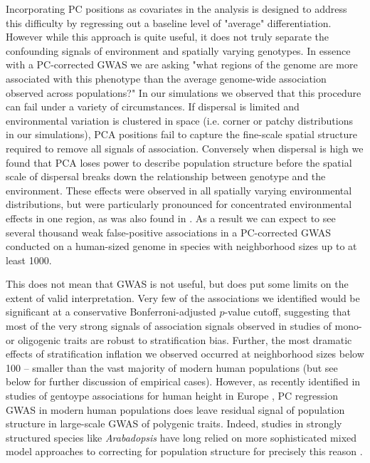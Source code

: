 \documentclass[11pt,twoside,lineno]{preprint}
\begin{document}
Incorporating PC positions as covariates in the analysis \citep{Price2006} is designed to address this difficulty by regressing out a baseline level of "average" differentiation. However while this approach is quite useful, it does not truly separate the confounding signals of environment and spatially varying genotypes. In essence with a PC-corrected GWAS we are asking "what regions of the genome are more associated with this phenotype than the average genome-wide association observed across populations?" In our simulations we observed that this procedure can fail under a variety of circumstances. If dispersal is limited and environmental variation is clustered in space (i.e. corner or patchy distributions in our simulations), PCA positions fail to capture the fine-scale spatial structure required to remove all signals of association. Conversely when dispersal is high we found that PCA loses power to describe population structure before the spatial scale of dispersal breaks down the relationship between genotype and the environment. These effects were observed in all spatially varying environmental distributions, but were particularly pronounced for concentrated environmental effects in one region, as was also found in \cite{Mathieson2012}. As a result we can expect to see several thousand weak false-positive associations in a PC-corrected GWAS conducted on a human-sized genome in species with neighborhood sizes up to at least 1000. 

This does not mean that GWAS is not useful, but does put some limits on the extent of valid interpretation. Very few of the associations we identified would be significant at a conservative Bonferroni-adjusted $p$-value cutoff, suggesting that most of the very strong signals of association signals observed in studies of mono- or oligogenic traits are robust to stratification bias. Further, the most dramatic effects of stratification inflation we observed occurred at neighborhood sizes below 100 -- smaller than the vast majority of modern human populations (but see below for further discussion of empirical cases). However, as recently identified in studies of gentoype associations for human height in Europe \citep{Berg2018,Sohail2018}, PC regression GWAS in modern human populations does leave residual signal of population structure in large-scale GWAS of polygenic traits. Indeed, studies in strongly structured species like \textit{Arabadopsis} have long relied on more sophisticated mixed model approaches to correcting for population structure for precisely this reason \citep{Aranzana2005,Sasaki2015}.
\end{document}
